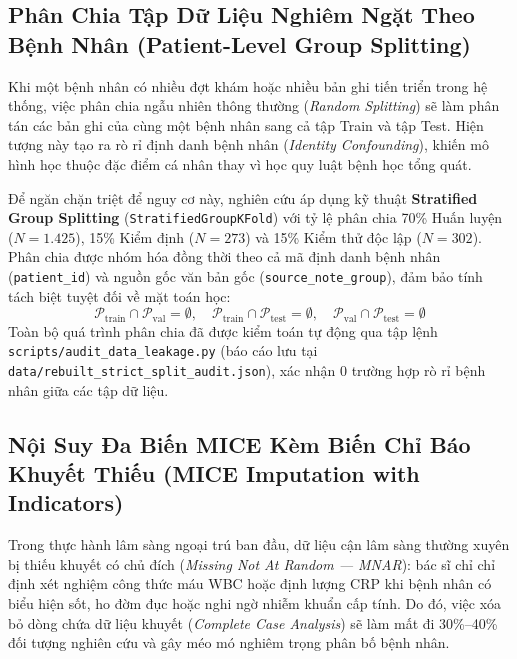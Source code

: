 \subsection{Phân Chia Tập Dữ Liệu Nghiêm Ngặt Theo Bệnh Nhân (Patient-Level Group Splitting)}
Khi một bệnh nhân có nhiều đợt khám hoặc nhiều bản ghi tiến triển trong hệ thống, việc phân chia ngẫu nhiên thông thường (\textit{Random Splitting}) sẽ làm phân tán các bản ghi của cùng một bệnh nhân sang cả tập Train và tập Test. Hiện tượng này tạo ra rò rỉ định danh bệnh nhân (\textit{Identity Confounding}), khiến mô hình học thuộc đặc điểm cá nhân thay vì học quy luật bệnh học tổng quát.

Để ngăn chặn triệt để nguy cơ này, nghiên cứu áp dụng kỹ thuật \textbf{Stratified Group Splitting} (\texttt{StratifiedGroupKFold}) với tỷ lệ phân chia 70\% Huấn luyện ($N = 1.425$), 15\% Kiểm định ($N = 273$) và 15\% Kiểm thử độc lập ($N = 302$). Phân chia được nhóm hóa đồng thời theo cả mã định danh bệnh nhân (\texttt{patient\_id}) và nguồn gốc văn bản gốc (\texttt{source\_note\_group}), đảm bảo tính tách biệt tuyệt đối về mặt toán học:
\begin{equation}
    \mathcal{P}_{\text{train}} \cap \mathcal{P}_{\text{val}} = \emptyset, \quad \mathcal{P}_{\text{train}} \cap \mathcal{P}_{\text{test}} = \emptyset, \quad \mathcal{P}_{\text{val}} \cap \mathcal{P}_{\text{test}} = \emptyset
\end{equation}
Toàn bộ quá trình phân chia đã được kiểm toán tự động qua tập lệnh \texttt{scripts/audit\_data\_leakage.py} (báo cáo lưu tại \texttt{data/rebuilt\_strict\_split_audit.json}), xác nhận $0$ trường hợp rò rỉ bệnh nhân giữa các tập dữ liệu.

\subsection{Nội Suy Đa Biến MICE Kèm Biến Chỉ Báo Khuyết Thiếu (MICE Imputation with Indicators)}
Trong thực hành lâm sàng ngoại trú ban đầu, dữ liệu cận lâm sàng thường xuyên bị thiếu khuyết có chủ đích (\textit{Missing Not At Random --- MNAR}): bác sĩ chỉ chỉ định xét nghiệm công thức máu WBC hoặc định lượng CRP khi bệnh nhân có biểu hiện sốt, ho đờm đục hoặc nghi ngờ nhiễm khuẩn cấp tính. Do đó, việc xóa bỏ dòng chứa dữ liệu khuyết (\textit{Complete Case Analysis}) sẽ làm mất đi 30\%--40\% đối tượng nghiên cứu và gây méo mó nghiêm trọng phân bố bệnh nhân.

